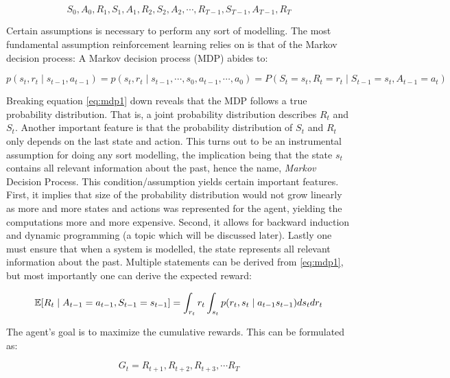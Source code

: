 \begin{equation}
    S_0, A_0, R_1, S_1, A_1, R_2, S_2, A_2, \cdots ,R_{T-1}, S_{T-1}, A_{T-1}, R_{T}
\end{equation}

Certain assumptions is necessary to perform any sort of modelling. The most fundamental assumption reinforcement learning relies on is that of the Markov decision process: A Markov decision process (MDP) abides to:

\begin{equation}\label{eq:mdp1}
    p(s_t, r_t \mid s_{t-1},  a_{t-1}) = p(s_t, r_t \mid s_{t-1},\cdots, s_{0}, a_{t-1}, \cdots, a_{0}) = P(S_t = s_t, R_t = r_t \mid S_{t-1} = s_t, A_{t-1} = a_t)
\end{equation}

Breaking equation \eqref{eq:mdp1} down reveals that the MDP follows a true probability distribution. That is, a joint probability distribution describes $R_t$ and $S_t$. Another important feature is that the probability distribution of $S_t$ and $R_t$ only depends on the last state and action. This turns out to be an instrumental assumption for doing any sort modelling, the implication being that the state $s_t$ contains all relevant information about the past, hence the name, \textit{Markov} Decision Process. This condition/assumption yields certain important features. First, it implies that size of the probability distribution would not grow linearly as more and more states and actions was represented for the agent, yielding the computations more and more expensive. Second, it allows for backward induction and dynamic programming (a topic which will be discussed later).  Lastly one must ensure that when a system is modelled, the state represents all relevant information about the past. Multiple statements can be derived from \eqref{eq:mdp1}, but most importantly one can derive the expected reward:

\begin{equation}
    \mathbb{E}[R_t \mid A_{t-1} = a_{t-1}, S_{t-1} = {s_{t-1}}] = \int_{r_t} r_t \int_{s_t} p(r_t, s_t \mid a_{t-1} s_{t-1}) d s_t d r_t 
\end{equation}

The agent's goal is to maximize the cumulative rewards. This can be formulated as:

\begin{equation}\label{eq:cum_rewards}
   G_t = R_{t+1}, R_{t+2}, R_{t+3}, \cdots R_{T}
\end{equation}

